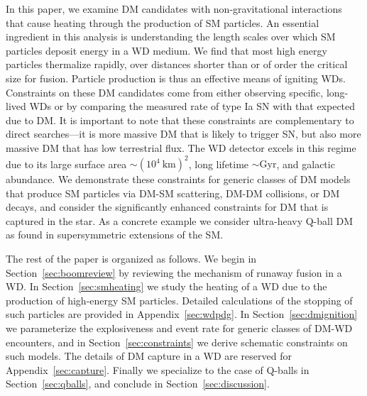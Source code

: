 In this paper, we examine DM candidates with non-gravitational interactions that cause heating through the production of SM particles.
An essential ingredient in this analysis is understanding the length scales over which SM particles deposit energy in a WD medium.
We find that most high energy particles thermalize rapidly, over distances shorter than or of order the critical size for fusion.
Particle production is thus an effective means of igniting WDs.
Constraints on these DM candidates come from either observing specific, long-lived WDs or by comparing the measured rate of type Ia SN with that expected due to DM.
It is important to note that these constraints are complementary to direct searches---it is more massive DM that is likely to trigger SN, but also more massive DM that has low terrestrial flux.
The WD detector excels in this regime due to its large surface area $\sim (10^4~\text{km})^2$, long lifetime $\sim \text{Gyr}$, and galactic abundance.
We demonstrate these constraints for generic classes of DM models that produce SM particles via DM-SM scattering, DM-DM collisions, or DM decays, and consider the significantly enhanced constraints for DM that is captured in the star.
As a concrete example we consider ultra-heavy Q-ball DM as found in supersymmetric extensions of the SM.

The rest of the paper is organized as follows.
We begin in Section~\ref{sec:boomreview} by reviewing the mechanism of runaway fusion in a WD.
In Section~\ref{sec:smheating} we study the heating of a WD due to the production of high-energy SM particles.
Detailed calculations of the stopping of such particles are provided in Appendix~\ref{sec:wdpdg}.
In Section~\ref{sec:dmignition} we parameterize the explosiveness and event rate for generic classes of DM-WD encounters, and in Section~\ref{sec:constraints} we derive schematic constraints on such models.
The details of DM capture in a WD are reserved for Appendix~\ref{sec:capture}.
Finally we specialize to the case of Q-balls in Section~\ref{sec:qballs}, and conclude in Section~\ref{sec:discussion}.
